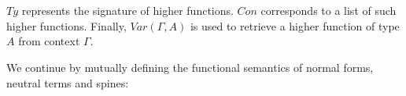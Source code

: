 \begin{code}
\AgdaSpace{}%
\AgdaSpace{}%
\AgdaSpace{}%
\AgdaSpace{}%
\<%
\\
\>[0]\AgdaSpace{}%
\AgdaSpace{}%
\AgdaSpace{}%
\AgdaSymbol{(}\AgdaSpace{}%
\AgdaOperator{\AgdaInductiveConstructor{,}}\AgdaSpace{}%
\AgdaSymbol{)}\AgdaSpace{}%
\AgdaSymbol{=}\AgdaSpace{}%
\<%
\\
\>[0]\AgdaSpace{}%
\AgdaSpace{}%
\AgdaSpace{}%
\AgdaSpace{}%
\AgdaSymbol{(}\AgdaSpace{}%
\AgdaOperator{\AgdaInductiveConstructor{,}}\AgdaSpace{}%
\AgdaSymbol{)}\AgdaSpace{}%
\AgdaSymbol{=}\AgdaSpace{}%
\AgdaSpace{}%
\AgdaSpace{}%
\AgdaSpace{}%
\<%
\end{code}

$Ty$ represents the signature of higher functions. $Con$ corresponds to a list of such higher functions. Finally, $Var(\Gamma,A)$ is used to retrieve a higher function of type $A$ from context $\Gamma$.

We continue by mutually defining the functional semantics of normal forms, neutral terms and spines:

\begin{code}[hide]%
\>[0]\<%
\end{code}

